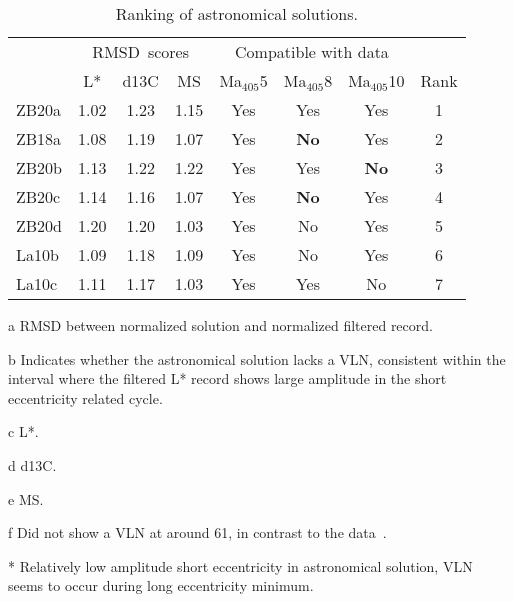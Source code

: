 \documentclass[]{agujournal2019}
\newcommand{\appr}{\raise.17ex\hbox{\(\scriptstyle\sim\)}} %
\newcommand{\ma}[1]{Ma\(_{405}\)#1} %
\begin{document}
\begin{table}
\begin{threeparttable}
\caption{
Ranking of astronomical solutions.
\label{tab:results}}
\centering
\begin{tabular}{lccccccc}
 & \multicolumn{3}{c}{\gls{RMSD}~scores\tnote{a}} & \multicolumn{3}{c}{Compatible with data\tnote{b}} & \\
 & \gls{L*}\tnote{c} & \gls{d13C}\tnote{d} & \gls{MS}\tnote{e} & \ma{5} & \ma{8} & \ma{10} & Rank \\
\hline
ZB20a & 1.02 & 1.23 & 1.15 & Yes & Yes & Yes & 1\\
ZB18a & 1.08 & 1.19 & 1.07 & Yes & \textbf{No} & Yes & 2\\
ZB20b & 1.13 & 1.22 & 1.22 & Yes & Yes & \textbf{No} & 3\\
ZB20c & 1.14 & 1.16 & 1.07 & Yes & \textbf{No} & Yes & 4\\
ZB20d & 1.20 & 1.20 & 1.03 & Yes & No\tnote{*} & Yes & 5\\
La10b & 1.09 & 1.18 & 1.09 & Yes & No\tnote{*} & Yes & 6\tnote{f}\\
La10c & 1.11 & 1.17 & 1.03 & Yes & Yes & No\tnote{*} & 7\tnote{f}\\
\hline
\end{tabular}
\begin{tablenotes}
    \item %
    \item [a] \Acrlong{RMSD} between normalized solution and normalized filtered record.
    \item [b] Indicates whether the astronomical solution lacks a \acrfull{VLN}, consistent within the interval where the filtered \gls{L*} record shows large amplitude in the short eccentricity related cycle.
    \item [c] \Acrfull{L*}.
    \item [d] \Acrfull{d13C}.
    \item [e] \Acrfull{MS}.
    \item [f] Did not show a \gls{VLN} at around \qty{61}{\millionyearago}, in contrast to the data~\cite{ZeebeLourens2022EPSL}.
    \item [*] Relatively low amplitude short eccentricity in astronomical solution, \gls{VLN} seems to occur during long eccentricity minimum.
\end{tablenotes}
\end{threeparttable}
\end{table}
\end{document}
